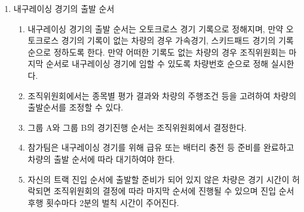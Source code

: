 \documentclass[final,a4paper,10pt]{report}
\begin{document}
{\begin{enumerate}
    \begin{enumerate}
      \item\label{rule:formula-competition.endurance.conduct.distance-and-manipulation-ban} 내구레이싱 경기의 총 주행거리는 조직위원회에서 약 20km 전후로 결정하며 경기 진행 중 참가팀의 허용되지 않은 임의 차량 조작은 허용되지 않는다.
      \item\label{rule:formula-competition.endurance.conduct.driver-change-required} 내구레이싱 경기 중 드라이버 교체가 요구된다.
      \item\label{rule:formula-competition.endurance.conduct.overtake-zone-only} 차량의 추월은 추월구간 또는 코스 경기진행요원의 지시 하에서만 가능하다.
      \item\label{rule:formula-competition.endurance.conduct.group-split-option} 조직위원회 결정에 따라 그룹 A와 그룹 B 경기를 구분하여 진행할 수 있다.
      \item\label{rule:formula-competition.endurance.conduct.transponder-or-stopwatch-timing} 내구레이스 경기 차량은 주어진 위치에 주행시간 계측기(트랜스폰더) 설치 의무가 있으며 경기 상황에 따라 계측기 대신 스톱워치를 이용하여 주행시간을 계측할 수 있다.
    \end{enumerate}
  \item\label{rule:formula-competition.endurance.start-order} 내구레이싱 경기의 출발 순서
    \begin{enumerate}
      \item\label{rule:formula-competition.endurance.start-order.prior-results-basis} 내구레이싱 경기의 출발 순서는 오토크로스 경기 기록으로 정해지며, 만약 오토크로스 경기의 기록이 없는 차량의 경우 가속경기, 스키드패드 경기의 기록 순으로 정하도록 한다. 만약 어떠한 기록도 없는 차량의 경우 조직위원회는 마지막 순서로 내구레이싱 경기에 임할 수 있도록 차량번호 순으로 정해 실시한다.
      \item\label{rule:formula-competition.endurance.start-order.committee-adjustment} 조직위원회에서는 종목별 평가 결과와 차량의 주행조건 등을 고려하여 차량의 출발순서를 조정할 수 있다.
      \item\label{rule:formula-competition.endurance.start-order.group-run-sequence} 그룹 A와 그룹 B의 경기진행 순서는 조직위원회에서 결정한다.
      \item\label{rule:formula-competition.endurance.start-order.prep-and-wait-turn} 참가팀은 내구레이싱 경기를 위해 급유 또는 배터리 충전 등 준비를 완료하고 차량의 출발 순서에 따라 대기하여야 한다.
      \item\label{rule:formula-competition.endurance.start-order.not-ready-penalty-2min} 자신의 트랙 진입 순서에 출발할 준비가 되어 있지 않은 차량은 경기 시간이 허락되면 조직위원회의 결정에 따라 마지막 순서에 진행될 수 있으며 진입 순서 후행 횟수마다 2분의 벌칙 시간이 주어진다.

\end{enumerate}
\end{enumerate}}
\end{document}
